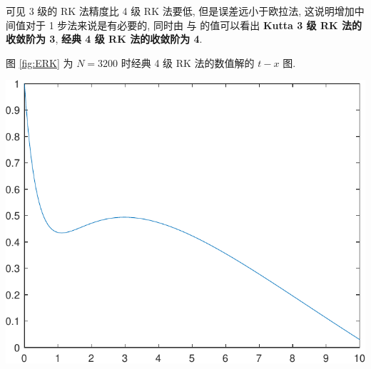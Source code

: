 \documentclass[twoside]{ctexart}
\begin{document}
    可见 3 级的 RK 法精度比 4 级 RK 法要低, 但是误差远小于欧拉法, 这说明增加中间值对于 1 步法来说是有必要的, 同时由  与  的值可以看出 \textbf{Kutta 3 级 RK 法的收敛阶为 3}, \textbf{经典 4 级 RK 法的收敛阶为 4}. 

    图 \ref{fig:ERK} 为 $ N=3200 $ 时经典 4 级 RK 法的数值解的 $ t-x $ 图. 
    \begin{center}
        \includegraphics[width=.4\textwidth]{figs/ERK.pdf}
        \label{fig:ERK}
    \end{center}
\end{document}
